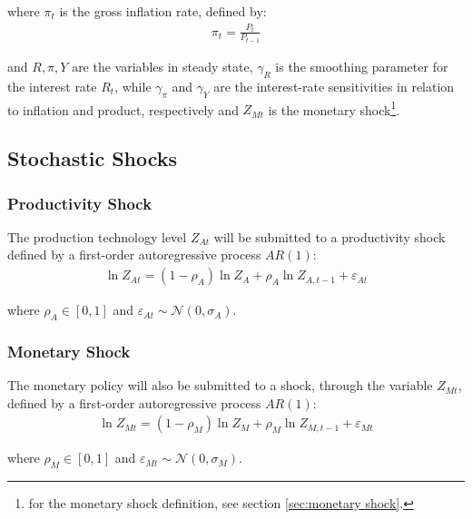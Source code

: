 \documentclass[
	12pt,
	]{article}
\numberwithin{equation}{section}
\theoremstyle{definition}
\theoremstyle{plain}
\theoremstyle{plain}
\theoremstyle{plain}
\begin{document}
where $\pi_t$ is the gross inflation rate, defined by:
\begin{align}
	\pi_t = \frac{P_t}{P_{t-1}}
	\label{eq:gross-inflation-rate}
\end{align}

and $R, \pi, Y$ are the variables in steady state, $\gamma_R$ is the smoothing parameter for the interest rate $R_t$, while $\gamma_\pi$ and $\gamma_Y$ are the interest-rate sensitivities in relation to inflation and product, respectively and $Z_{Mt}$ is the monetary shock\footnote{for the monetary shock definition, see section \ref{sec:monetary shock}.}.


\subsection{Stochastic Shocks}\label{sec:stochastic-shocks}

\subsubsection*{Productivity Shock} \label{sec:productivity shock}

The production technology level $Z_{At}$ will be submitted to a productivity shock defined by a first-order autoregressive process $AR(1)$:
\begin{align}
	\ln{Z_{At}} = (1-\rho_A)\ln{Z_A} + \rho_A\ln{Z_{A,t-1}} + \varepsilon_{At} \label{eq:productivity-shock}
\end{align}

where $\rho_A \in [0,1]$ and $\varepsilon_{At} \sim \mathscr{N}(0,\sigma_A)$.

\subsubsection*{Monetary Shock} \label{sec:monetary shock}

The monetary policy will also be submitted to a shock, through the variable $Z_{Mt}$, defined by a first-order autoregressive process $AR(1)$:
\begin{align}
	\ln{Z_{Mt}} = (1-\rho_M)\ln{Z_{M}} + \rho_M\ln{Z_{M,t-1}} + \varepsilon_{Mt} \label{eq:monetary-shock}
\end{align}

where $\rho_M \in [0,1]$ and $\varepsilon_{Mt} \sim \mathscr{N}(0,\sigma_M)$.
\end{document}
